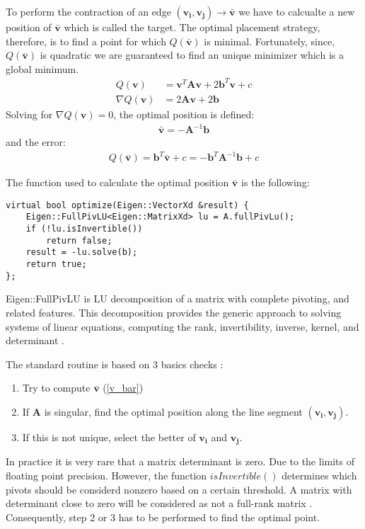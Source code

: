 To perform the contraction of an edge $(\mathbf{v_i}, \mathbf{v_j})\rightarrow\bar{\mathbf{v}}$ we have to calcualte a new position of $\mathbf{\bar{v}}$ which is called the target. The optimal placement strategy, therefore, is to find a point for which $Q(\mathbf{\bar{v}})$ is minimal. Fortunately, since, $Q(\mathbf{\bar{v}})$ is quadratic we are guaranteed to find an unique minimizer which is a global minimum.
\begin{align}
Q(\mathbf{v}) &= \mathbf{v}^T\mathbf{A}\mathbf{v} + 2\mathbf{b}^T\mathbf{v} + c\\
\nabla Q(\mathbf{v}) &= 2\mathbf{A}\mathbf{v} + 2 \mathbf{b}
\end{align}
Solving for $\nabla Q(\mathbf{v}) = 0$, the optimal position is defined:
\begin{align}
\mathbf{\bar{v}} = -\mathbf{A}^{-1}\mathbf{b}
\label{v_bar}
\end{align}
and the error:
\begin{align}
Q(\mathbf{\bar{v}}) = \mathbf{b}^T\mathbf{\bar{v}} + c = -\mathbf{b}^T\mathbf{A}^{-1}\mathbf{b} + c
\end{align}

The function used to calculate the optimal position $\mathbf{\bar{v}}$ is the following:
\begin{center}
\begin{lstlisting}[caption={LU decomposition for solving a linear system.},captionpos=b]
virtual bool optimize(Eigen::VectorXd &result) {
	Eigen::FullPivLU<Eigen::MatrixXd> lu = A.fullPivLu();
	if (!lu.isInvertible())
		return false;
	result = -lu.solve(b);
	return true;
};
\end{lstlisting}
\end{center}
Eigen::FullPivLU is LU decomposition of a matrix with complete pivoting, and related features. This decomposition provides the generic approach to solving systems of linear equations, computing the rank, invertibility, inverse, kernel, and determinant \cite{eigenLU19}.

The standard routine is based on 3 basics checks \cite{garland99}:
\begin{enumerate}
\item Try to compute $\mathbf{\bar{v}}$ (\ref{v_bar})
\item If $\mathbf{A}$ is singular, find the optimal position along the line segment $(\mathbf{v_i}, \mathbf{v_j})$.
\item If this is not unique, select the better of $\mathbf{v_i}$ and $ \mathbf{v_j}$.
\end{enumerate}
In practice it is very rare that a matrix determinant is zero. Due to the limits of floating point precision. However, the function $isInvertible()$ determines which pivots should be considerd nonzero based on a certain threshold. A matrix with determinant close to zero will be considered as not a full-rank matrix \cite{strang88}. Consequently, step 2 or 3 has to be performed to find the optimal point.

